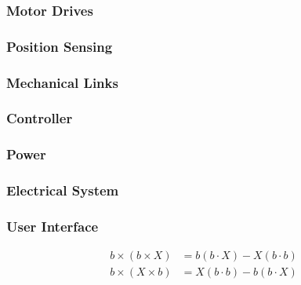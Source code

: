 \documentclass[a4paper,10pt]{article}
\begin{document}
\subsubsection{Motor Drives}

\subsubsection{Position Sensing}

\subsubsection{Mechanical Links}

\subsubsection{Controller}

\subsubsection{Power}

\subsubsection{Electrical System}

\subsubsection{User Interface}

\newpage
\begin{align}
 b\times(b\times X) &= b(b\cdot X)-X(b\cdot b) \nonumber \\
 b\times(X\times b) &= X(b\cdot b)-b(b\cdot X) \nonumber \\
\end{align}
\end{document}
